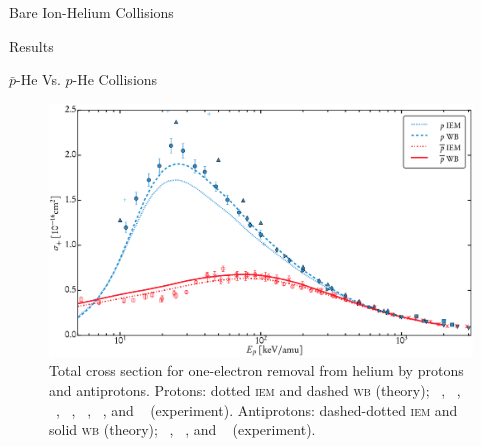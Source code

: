 \documentclass[a5paper, 9 pt]{extreport}
\begin{document}
\begin{chapter}{Bare Ion-Helium Collisions \label{chap:p-he2p-he}}
\begin{section}{Results \label{sec:phe2p-res}}
\begin{subsection}{ \texorpdfstring{$\bar{p}$}{pbar}-He Vs. \texorpdfstring{$p$}{p}-He Collisions
                         \label{sec:pbarhe-res}}
         \begin{figure}[t]
            \centering
            \includegraphics[width = 0.95 \linewidth]{./images/pbarhe/pbarhe-+.eps}
            \caption[Total cross section for one-electron removal from helium by protons and
                     antiprotons.]
                    {Total cross section for one-electron removal from helium by protons and
                     antiprotons. Protons: dotted \textsc{iem} and dashed \textsc{wb} (theory);
                     {\color{blue}{$\blacktriangle$}}~\cite{DTR84}, {\color{blue}{$+$}}~\cite{Sol62},
                     {\color{blue}{$\bullet$}}~\cite{SG89}, {\color{blue}{$\blacklozenge$}}~\cite{SG85},
                     {\color{blue}{$\blacktriangleright$}}~\cite{PM70},
                     {\color{blue}{$\blacktriangledown$}}~\cite{Wex64},
                     and {\color{blue}{$\blacksquare$}}~\cite{KAH84} (experiment).
                     Antiprotons: dashed-dotted \textsc{iem} and solid \textsc{wb} (theory);
                     {\color{red}{$\Box$}}~\cite{KKT08}, {\color{red}{$\circ$}}~\cite{HKM94},
                     and {\color{red}{$\times$}}~\cite{AHK90} (experiment). \label{fig:he+}}
         \end{figure}


\end{subsection}
\end{section}
\end{chapter}
\end{document}

